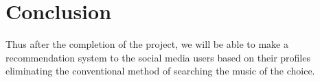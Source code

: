 \documentclass{article}
\begin{document}
\section{Conclusion}
Thus after the completion of the project, we will be able to make a recommendation system to the social media users based on their profiles eliminating the conventional method of searching the music of the choice.
\cleardoublepage



\nocite{*}
\end{document}
